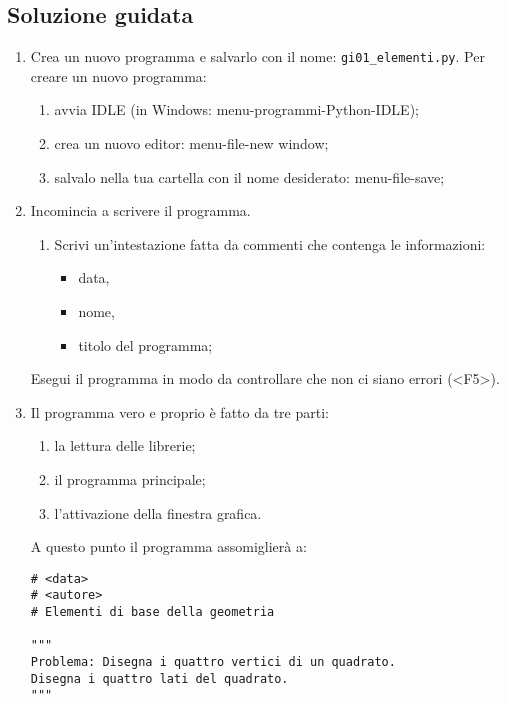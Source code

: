 \subsection{Soluzione guidata}

\begin{enumerate} [noitemsep]
\item Crea un nuovo programma e salvarlo con il nome: 
\texttt{gi01\_elementi.py}.
Per creare un nuovo programma:

\begin{enumerate} [noitemsep]
\item avvia IDLE (in Windows: menu-programmi-Python-IDLE);
\item crea un nuovo editor: menu-file-new window;
\item salvalo nella tua cartella con il nome desiderato: menu-file-save;
\end{enumerate}

\item Incomincia a scrivere il programma.
\begin{enumerate} [noitemsep]
\item Scrivi un'intestazione fatta da commenti che contenga le informazioni:

\begin{itemize} [noitemsep]
\item data,
\item nome,
\item titolo del programma;
\end{itemize}
\end{enumerate}

Esegui il programma in modo da controllare che non ci siano errori 
(\textless{}F5\textgreater{}).
\item Il programma vero e proprio è fatto da tre parti:

\begin{enumerate} [noitemsep]
\item la lettura delle librerie;
\item il programma principale;
\item l'attivazione della finestra grafica.
\end{enumerate}

A questo punto il programma assomiglierà a:

\begin{lstlisting}
# <data>
# <autore>
# Elementi di base della geometria

"""
Problema: Disegna i quattro vertici di un quadrato.
Disegna i quattro lati del quadrato.
"""


\end{lstlisting}
\end{enumerate}
